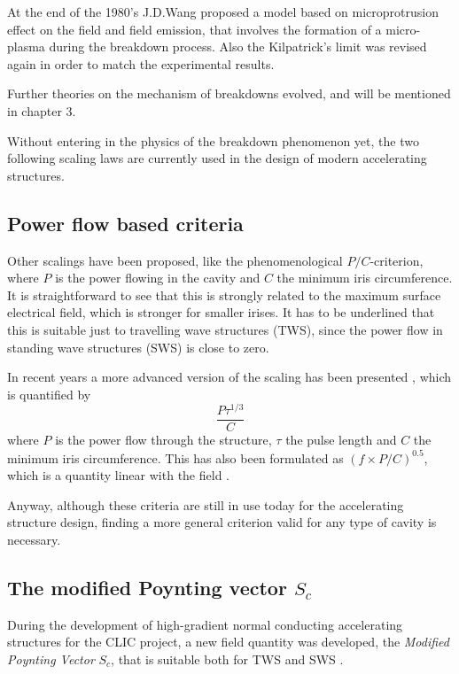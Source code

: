 At the end of the 1980's J.D.Wang proposed a model based on microprotrusion effect on the field and field emission, that involves the formation of a micro-plasma during the breakdown process. Also the Kilpatrick's limit was revised again in order to match the experimental results. \cite{Wang:1986, kilp:story}

Further theories on the mechanism of breakdowns evolved, and will be mentioned in chapter 3.

Without entering in the physics of the breakdown phenomenon yet, the two following scaling laws are currently used in the design of modern accelerating structures.

\subsection[Power flow based criteria]{Power flow based criteria}

Other scalings have been proposed, like the phenomenological $P/C$-criterion, where $P$ is the power flowing in the cavity and $C$ the minimum iris circumference. It is straightforward to see that this is strongly related to the maximum surface electrical field, which is stronger for smaller irises. It has to be underlined that this is suitable just to travelling wave structures (TWS), since the power flow in standing wave structures (SWS) is close to zero. 

In recent years a more advanced version of the scaling has been presented \cite{Wuensch:932674}, which is quantified by
\begin{equation}
\frac{P \tau^{1/3}}{C}
\end{equation}
where $P$ is the power flow through the structure, $\tau$ the pulse length and $C$ the minimum iris circumference. This has also been formulated as $(f \times P/C )^{0.5}$, which is a quantity linear with the field \cite{Wuensch:advaces}.

Anyway, although these criteria are still in use today for the accelerating structure design, finding a more general criterion valid for any type of cavity is necessary.

\subsection{The modified Poynting vector $S_c$}

During the development of high-gradient normal conducting accelerating structures for the CLIC project, a new field quantity was developed, the \textit{Modified Poynting Vector} $S_c$, that is suitable both for TWS and SWS \cite{Grudiev:newLoc}.

